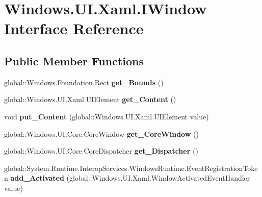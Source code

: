 \hypertarget{interface_windows_1_1_u_i_1_1_xaml_1_1_i_window}{}\section{Windows.\+U\+I.\+Xaml.\+I\+Window Interface Reference}
\label{interface_windows_1_1_u_i_1_1_xaml_1_1_i_window}
\subsection*{Public Member Functions}
\begin{DoxyCompactItemize}
\item 
\mbox{\label{interface_windows_1_1_u_i_1_1_xaml_1_1_i_window_af2863431652d1fabebc1b69ecfd57046}} 
global\+::\+Windows.\+Foundation.\+Rect {\bfseries get\+\_\+\+Bounds} ()
\item 
\mbox{\label{interface_windows_1_1_u_i_1_1_xaml_1_1_i_window_afa1d6f285027cb3cb96ea5f24bfcf835}} 
global\+::\+Windows.\+U\+I.\+Xaml.\+U\+I\+Element {\bfseries get\+\_\+\+Content} ()
\item 
\mbox{\label{interface_windows_1_1_u_i_1_1_xaml_1_1_i_window_a2d901a6fe27bc44318e84499ea7c8f9b}} 
void {\bfseries put\+\_\+\+Content} (global\+::\+Windows.\+U\+I.\+Xaml.\+U\+I\+Element value)
\item 
\mbox{\label{interface_windows_1_1_u_i_1_1_xaml_1_1_i_window_a88fdb6132a02265b78f40881de9331dd}} 
global\+::\+Windows.\+U\+I.\+Core.\+Core\+Window {\bfseries get\+\_\+\+Core\+Window} ()
\item 
\mbox{\label{interface_windows_1_1_u_i_1_1_xaml_1_1_i_window_a500f2f06a9d802fb139e8005d1ece28b}} 
global\+::\+Windows.\+U\+I.\+Core.\+Core\+Dispatcher {\bfseries get\+\_\+\+Dispatcher} ()
\item 
\mbox{\label{interface_windows_1_1_u_i_1_1_xaml_1_1_i_window_ab6f49a1482246a7a6cf23ac64ec3469b}} 
global\+::\+System.\+Runtime.\+Interop\+Services.\+Windows\+Runtime.\+Event\+Registration\+Token {\bfseries add\+\_\+\+Activated} (global\+::\+Windows.\+U\+I.\+Xaml.\+Window\+Activated\+Event\+Handler value)

\end{DoxyCompactItemize}
